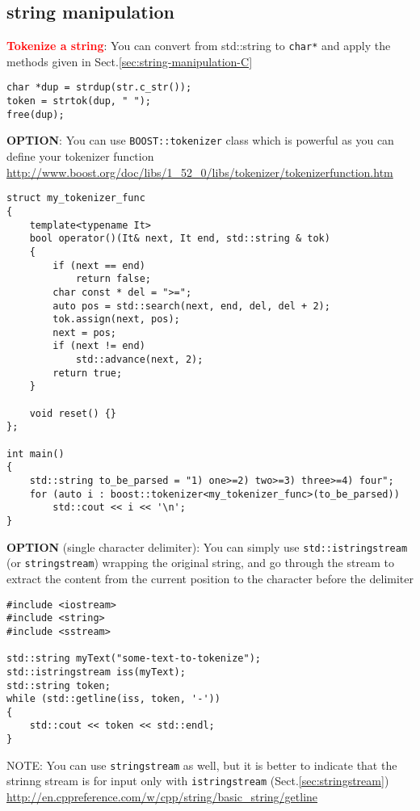 \subsection{ string manipulation}
\label{sec:string-manipulation-C++}

\textcolor{red}{\bf Tokenize a string}:
You can convert from std::string to \verb!char*! and apply the methods given in
Sect.\ref{sec:string-manipulation-C}
\begin{lstlisting}
char *dup = strdup(str.c_str());
token = strtok(dup, " ");
free(dup);
\end{lstlisting}

{\bf OPTION}:
You can use \verb!BOOST::tokenizer! class which is powerful as you can define
your tokenizer function 
\url{http://www.boost.org/doc/libs/1_52_0/libs/tokenizer/tokenizerfunction.htm}
\begin{lstlisting}
struct my_tokenizer_func
{
    template<typename It>
    bool operator()(It& next, It end, std::string & tok)
    {
        if (next == end)
            return false;
        char const * del = ">=";
        auto pos = std::search(next, end, del, del + 2);
        tok.assign(next, pos);
        next = pos;
        if (next != end)
            std::advance(next, 2);
        return true;
    }

    void reset() {}
};

int main()
{
    std::string to_be_parsed = "1) one>=2) two>=3) three>=4) four";
    for (auto i : boost::tokenizer<my_tokenizer_func>(to_be_parsed))
        std::cout << i << '\n';
}
\end{lstlisting}


{\bf OPTION} (single character delimiter): You can simply use
\verb!std::istringstream! (or \verb!stringstream!) wrapping the original string, and go through the stream
to extract the content from the current position to the character before the delimiter
\begin{lstlisting}
#include <iostream>
#include <string>
#include <sstream>

std::string myText("some-text-to-tokenize");
std::istringstream iss(myText);
std::string token;
while (std::getline(iss, token, '-'))
{
    std::cout << token << std::endl;
}
\end{lstlisting}
NOTE: You can use \verb!stringstream! as well, but it is better to indicate that
the strinng stream is for input only with \verb!istringstream!
(Sect.\ref{sec:stringstream})
\url{http://en.cppreference.com/w/cpp/string/basic_string/getline}

